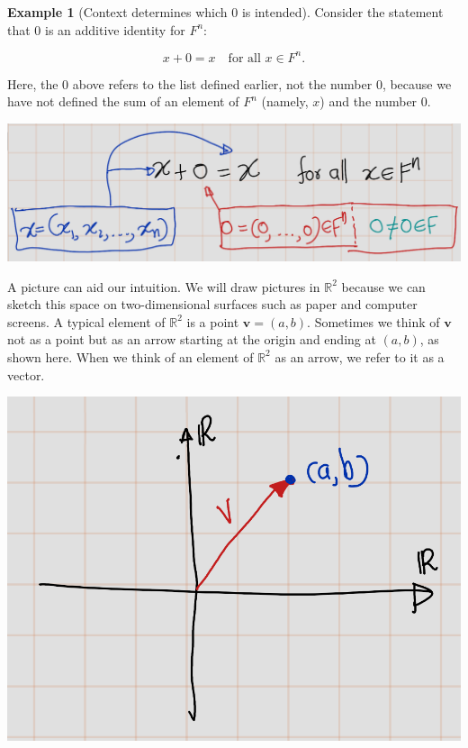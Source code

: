 \documentclass[
]{book}
\theoremstyle{definition}
\theoremstyle{definition}
\newtheorem{example}{Example}[chapter]
\theoremstyle{definition}
\theoremstyle{definition}
\theoremstyle{remark}
\begin{document}
\begin{example}[Context determines which 0 is intended]
\protect\hypertarget{exm:unnamed-chunk-14}{}\label{exm:unnamed-chunk-14}Consider the statement that \(0\) is an additive identity for \(F^n\):

\[ x + 0 = x \quad \text{for all } x \in F^n. \]

Here, the \(0\) above refers to the list defined earlier, not the number \(0\), because we have not defined the sum of an element of \(F^n\) (namely, \(x\)) and the number \(0\).
\end{example}

\includegraphics{fig/Chapter-1/fig2.png}

A picture can aid our intuition. We will draw pictures in \(\mathbb{R}^2\) because we can sketch this space on two-dimensional surfaces such as paper and computer screens. A typical element of \(\mathbb{R}^2\) is a point \(\mathbf{v} = (a, b)\). Sometimes we think of \(\mathbf{v}\) not as a point but as an arrow starting at the origin and ending at \((a, b)\), as shown here. When we think of an element of \(\mathbb{R}^2\) as an arrow, we refer to it as a vector.

\includegraphics{fig/Chapter-1/fig3.png}
\end{document}
